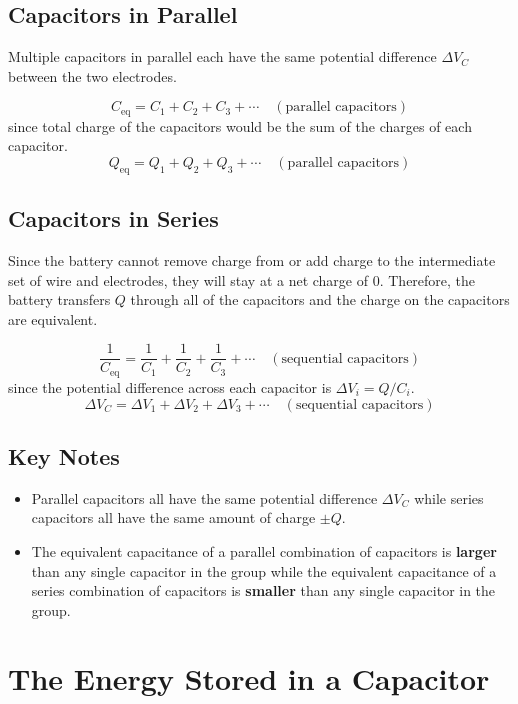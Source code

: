 \documentclass{article}
\begin{document}
\subsection*{Capacitors in Parallel}

Multiple capacitors in parallel each have the same potential difference $\Delta V_C$ between the
two electrodes.

\[C_\text{eq}=C_1 + C_2 + C_3 + \cdots\quad (\text{parallel capacitors})\]
since total charge of the capacitors would be the sum of the charges of each capacitor.
\[Q_\text{eq}=Q_1 + Q_2 + Q_3 + \cdots\quad (\text{parallel capacitors})\]

\subsection*{Capacitors in Series}

Since the battery cannot remove charge from or add charge to the intermediate set of wire and
electrodes, they will stay at a net charge of 0. Therefore, the battery transfers $Q$ through all
of the capacitors and the charge on the capacitors are equivalent.

\[\frac{1}{C_\text{eq}}=\frac{1}{C_1} + \frac{1}{C_2} + \frac{1}{C_3} + \cdots\quad
(\text{sequential capacitors})\]
since the potential difference across each capacitor is $\Delta V_i = Q/C_i$.
\[\Delta V_C=\Delta V_1 + \Delta V_2 + \Delta V_3 + \cdots\quad (\text{sequential capacitors})\]

\subsection*{Key Notes}
\begin{itemize}
    \item Parallel capacitors all have the same potential difference $\Delta V_C$ while series
    capacitors all have the same amount of charge $\pm Q$.
    \item The equivalent capacitance of a parallel combination of capacitors is \textbf{larger}
    than any single capacitor in the group while the equivalent capacitance of a series combination
    of capacitors is \textbf{smaller} than any single capacitor in the group.
\end{itemize}

\section*{The Energy Stored in a Capacitor}
\end{document}
